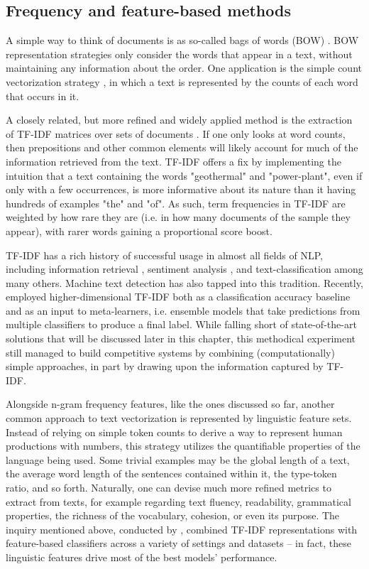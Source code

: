 \subsection{Frequency and feature-based methods}

A simple way to think of documents is as so-called bags of words (BOW) \citep{murphy2006naive}.
BOW representation strategies only consider the words that appear in a text, without maintaining any information about the order.
One application is the simple count vectorization strategy \citep{wendland2021introduction}, in which a text is represented by the counts of each word that occurs in it.

A closely related, but more refined and widely applied method is the extraction of TF-IDF matrices over sets of documents \citep{ramos2003using}.
If one only looks at word counts, then prepositions and other common elements will likely account for much of the information retrieved from the text.
TF-IDF offers a fix by implementing the intuition that a text containing the words "geothermal" and "power-plant", even if only with a few occurrences, is more informative about its nature than it having hundreds of examples "the" and "of".
As such, term frequencies in TF-IDF are weighted by how rare they are (i.e. in how many documents of the sample they appear), with rarer words gaining a proportional score boost.

TF-IDF has a rich history of successful usage in almost all fields of NLP, including information retrieval \citep{ramos2003using}, sentiment analysis \citep{cahyani2021performance}, and text-classification \citep{zhang2011comparative} among many others.
Machine text detection has also tapped into this tradition. 
Recently, \citet{frohling2021feature} employed higher-dimensional TF-IDF both as a classification accuracy baseline and as an input to meta-learners, i.e. ensemble models that take predictions from multiple classifiers to produce a final label.
While falling short of state-of-the-art solutions that will be discussed later in this chapter, this methodical experiment still managed to build competitive systems by combining (computationally) simple approaches, in part by drawing upon the information captured by TF-IDF.

Alongside n-gram frequency features, like the ones discussed so far, another common approach to text vectorization is represented by linguistic feature sets.
Instead of relying on simple token counts to derive a way to represent human productions with numbers, this strategy utilizes the quantifiable properties of the language being used.
Some trivial examples may be the global length of a text, the average word length of the sentences contained within it, the type-token ratio, and so forth.
Naturally, one can devise much more refined metrics to extract from texts, for example regarding text fluency, readability, grammatical properties, the richness of the vocabulary, cohesion, or even its purpose.
The inquiry mentioned above, conducted by \citet{frohling2021feature}, combined TF-IDF representations with feature-based classifiers across a variety of settings and datasets -- in fact, these linguistic features drive most of the best models' performance.

